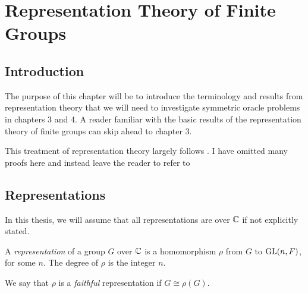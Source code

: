 
\chapter{Representation Theory of Finite Groups}

\section{Introduction}



The purpose of this chapter will be to introduce the terminology and results from representation theory that we 
will need to investigate symmetric oracle problems in chapters 3 and 4. A reader familiar with the basic results of 
the representation theory of finite groups can skip ahead to chapter 3. 

This treatment of representation theory largely follows \cite{James&Liebeck}. I have omitted many proofs here and 
instead leave the reader to refer to \cite{James&Liebeck}

\section{Representations}

In this thesis, we will assume that all representations are over $\mathbb{C} $ if not explicitly stated.

\begin{definition}
    A \emph{representation} of a group $G$ over $\mathbb{C}$ is a homomorphism $\rho$ from $G$ to $\operatorname{GL}(n,F)$, for some $n$. 
    The degree of $\rho$ is the integer $n$.

    We say that $\rho$ is a \emph{faithful} representation if $G \cong \rho(G)$.
\end{definition}

